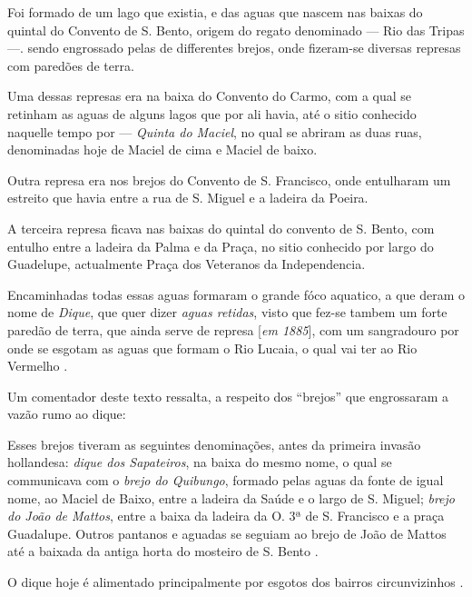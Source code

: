\begin{citacao}
Foi formado de um lago que existia, e das aguas que nascem nas baixas do quintal do Convento de S. Bento, origem do regato denominado --- Rio das Tripas ---. sendo engrossado pelas de differentes brejos, onde fizeram-se diversas represas com paredões de terra.

Uma dessas represas era na baixa do Convento do Carmo, com a qual se retinham as aguas de alguns lagos que por ali havia, até o sitio conhecido naquelle tempo por --- \textit{Quinta do Maciel}, no qual se abriram as duas ruas, denominadas hoje de Maciel de cima e Maciel de baixo.

Outra represa era nos brejos do Convento de S. Francisco, onde entulharam um estreito que havia entre a rua de S. Miguel e a ladeira da Poeira.

A terceira represa ficava nas baixas do quintal do convento de S. Bento, com entulho entre a ladeira da Palma e da Praça, no sitio conhecido por largo do Guadelupe, actualmente Praça dos Veteranos da Independencia.

Encaminhadas todas essas aguas formaram o grande fóco aquatico, a que deram o nome de \textit{Dique}, que quer dizer \textit{aguas retidas}, visto que fez-se tambem um forte paredão de terra, que ainda serve de represa [\textit{em 1885}], com um sangradouro por onde se esgotam as aguas que formam o Rio Lucaia, o qual vai ter ao Rio Vermelho \cite[pp.~393-394]{amaral_resumo_2013}. 
\end{citacao}

Um comentador deste texto ressalta, a respeito dos ``brejos'' que engrossaram a vazão rumo ao dique:

\begin{citacao}
Esses brejos tiveram as seguintes denominações, antes da primeira invasão hollandesa: \textit{dique dos Sapateiros}, na baixa do mesmo nome, o qual se communicava com o \textit{brejo do Quibungo}, formado pelas aguas da fonte de igual nome, ao Maciel de Baixo, entre a ladeira da Saúde e o largo de S. Miguel; \textit{brejo do João de Mattos}, entre a baixa da ladeira da O. 3ª de S. Francisco e a praça Guadalupe. Outros pantanos e aguadas se seguiam ao brejo de João de Mattos até a baixada da antiga horta do mosteiro de S. Bento \cite[pp.~393-394]{amaral_resumo_2013}.
\end{citacao}

O dique hoje é alimentado principalmente por esgotos dos bairros circunvizinhos \cite[p.~41]{santos_aguas_2010}.


